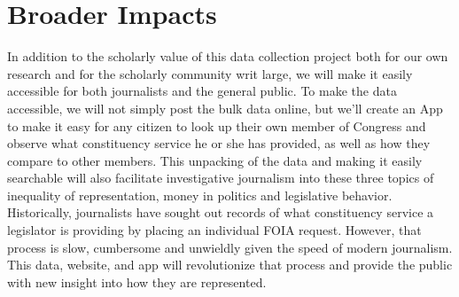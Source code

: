 \documentclass{article}
\begin{document}
\section*{Broader Impacts}

In addition to the scholarly value of this data collection project both for our own research and for the scholarly community writ large, we will make it easily accessible for both journalists and the general public. To make the data accessible, we will not simply post the bulk data online, but we'll create an App to make it easy for any citizen to look up their own member of Congress and observe what constituency service he or she has provided, as well as how they compare to other members. This unpacking of the data and making it easily searchable will also facilitate investigative journalism into these three topics of inequality of representation, money in politics and legislative behavior. Historically, journalists have sought out records of what constituency service a legislator is providing by placing an individual FOIA request. However, that process is slow, cumbersome and unwieldly given the speed of modern journalism. This data, website, and app will revolutionize that process and provide the public with new insight into how they are represented. 





\end{document}
